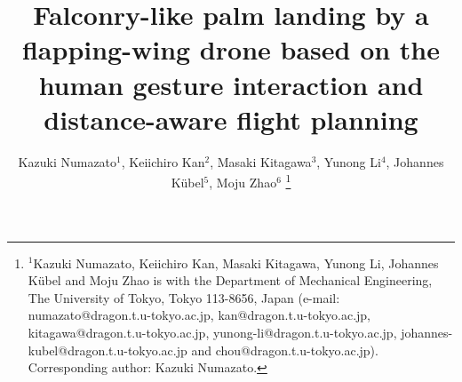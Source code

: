 \documentclass[letterpaper, 10 pt, conference]{ieeeconf}  %
\title{\LARGE \bf
Falconry-like palm landing by a flapping-wing drone based on the human gesture interaction and distance-aware flight planning
}
\author{Kazuki Numazato$^{1}$, Keiichiro Kan$^{2}$, Masaki Kitagawa$^{3}$, Yunong Li$^{4}$, Johannes Kübel$^{5}$, Moju Zhao$^{6}$ %
\thanks{$^{1}$Kazuki Numazato, Keiichiro Kan, Masaki Kitagawa, Yunong Li, Johannes Kübel and Moju Zhao is with the Department of Mechanical Engineering, The University of Tokyo, Tokyo 113-8656, Japan (e-mail: numazato@dragon.t.u-tokyo.ac.jp, kan@dragon.t.u-tokyo.ac.jp, kitagawa@dragon.t.u-tokyo.ac.jp, yunong-li@dragon.t.u-tokyo.ac.jp, johannes-kubel@dragon.t.u-tokyo.ac.jp and chou@dragon.t.u-tokyo.ac.jp). Corresponding author: Kazuki Numazato.}}%
\begin{document}
\maketitle
\thispagestyle{empty}
\pagestyle{empty}

\begin{abstract}

\end{abstract}








\addtolength{\textheight}{-12cm}   %



\end{document}
